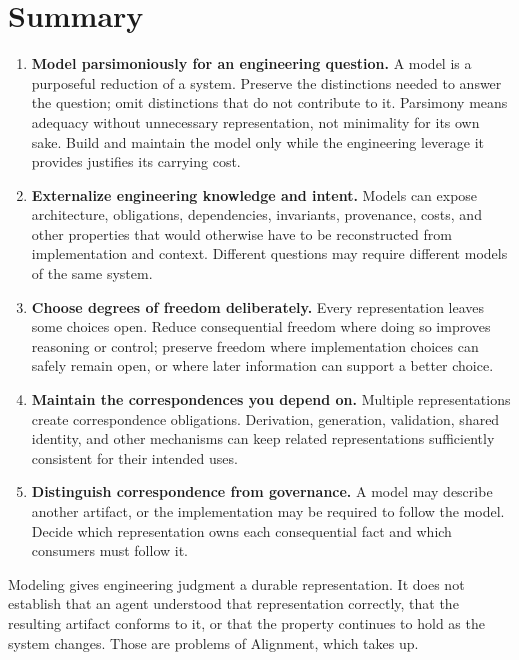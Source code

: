 



\chapter{Summary}

\begin{enumerate}
\def\labelenumi{\arabic{enumi}.}
\tightlist
\item
  \textbf{Model parsimoniously for an engineering question.} A model is a purposeful reduction of a system. Preserve the distinctions needed to answer the question; omit distinctions that do not contribute to it. Parsimony means adequacy without unnecessary representation, not minimality for its own sake. Build and maintain the model only while the engineering leverage it provides justifies its carrying cost.
\item
  \textbf{Externalize engineering knowledge and intent.} Models can expose architecture, obligations, dependencies, invariants, provenance, costs, and other properties that would otherwise have to be reconstructed from implementation and context. Different questions may require different models of the same system.
\item
  \textbf{Choose degrees of freedom deliberately.} Every representation leaves some choices open. Reduce consequential freedom where doing so improves reasoning or control; preserve freedom where implementation choices can safely remain open, or where later information can support a better choice.
\item
  \textbf{Maintain the correspondences you depend on.} Multiple representations create correspondence obligations. Derivation, generation, validation, shared identity, and other mechanisms can keep related representations sufficiently consistent for their intended uses.
\item
  \textbf{Distinguish correspondence from governance.} A model may describe another artifact, or the implementation may be required to follow the model. Decide which representation owns each consequential fact and which consumers must follow it.
\end{enumerate}

Modeling gives engineering judgment a durable representation. It does not establish that an agent understood that representation correctly, that the resulting artifact conforms to it, or that the property continues to hold as the system changes. Those are problems of Alignment, which  takes up.

